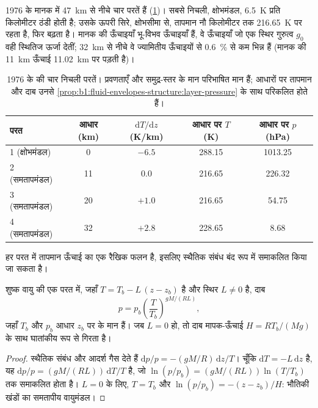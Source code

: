 1976 के मानक में \qty{47}{km} से नीचे चार परतें हैं (\cref{tab:b1:fluid-envelopes-structure:layers})। सबसे निचली, क्षोभमंडल, \qty{6.5}{K} प्रति किलोमीटर ठंडी होती है; उसके ऊपरी सिरे, क्षोभसीमा से, तापमान नौ किलोमीटर तक \qty{216.65}{K} पर रहता है, फिर बढ़ता है। मानक की ऊँचाइयाँ भू-विभव ऊँचाइयाँ हैं, वे ऊँचाइयाँ जो एक स्थिर गुरुत्व $g_0$ वही स्थितिज ऊर्जा देतीं; \qty{32}{km} से नीचे वे ज्यामितीय ऊँचाइयों से \qty{0.6}{\percent} से कम भिन्न हैं (मानक की \qty{11}{km} ऊँचाई \qty{11.02}{km} पर पड़ती है)।

\begin{table}[ht]
\centering
\small
\renewcommand{\arraystretch}{1.2}
\begin{tabular}{|l|c|c|c|c|}
\hline
परत & आधार (km) & $\mathrm dT/\mathrm dz$ (K/km) & आधार पर $T$ (K) & आधार पर $p$ (hPa) \\
\hline
1 (क्षोभमंडल) & 0 & $-6.5$ & 288.15 & 1013.25 \\
2 (समतापमंडल) & 11 & 0.0 & 216.65 & 226.32 \\
3 (समतापमंडल) & 20 & $+1.0$ & 216.65 & 54.75 \\
4 (समतापमंडल) & 32 & $+2.8$ & 228.65 & 8.68 \\
\hline
\end{tabular}
\caption{1976 के  की चार निचली परतें। प्रवणताएँ और समुद्र-स्तर के मान परिभाषित मान हैं; आधारों पर तापमान और दाब उनसे \cref{prop:b1:fluid-envelopes-structure:layer-pressure} के साथ परिकलित होते हैं।}
\label{tab:b1:fluid-envelopes-structure:layers}
\end{table}

हर परत में तापमान ऊँचाई का एक रैखिक फलन है, इसलिए स्थैतिक संबंध बंद रूप में समाकलित किया जा सकता है।

\begin{proposition}\label{prop:b1:fluid-envelopes-structure:layer-pressure}
शुष्क वायु की एक परत में, जहाँ $T = T_b - L\,(z - z_b)$ है और स्थिर $L \neq 0$ है, दाब
\[
  p = p_b \left(\frac{T}{T_b}\right)^{gM/(RL)},
\]
जहाँ $T_b$ और $p_b$ आधार $z_b$ पर के मान हैं। जब $L = 0$ हो, तो दाब मापक-ऊँचाई $H = RT_b/(Mg)$ के साथ घातांकीय रूप से गिरता है।
\end{proposition}

\begin{proof}
स्थैतिक संबंध और आदर्श गैस देते हैं $\mathrm dp/p = -(gM/R)\,\mathrm
dz/T$। चूँकि $\mathrm dT = -L\,\mathrm dz$ है, यह $\mathrm dp/p =
(gM/(RL))\,\mathrm dT/T$ है, जो $\ln(p/p_b) = (gM/(RL))
\ln(T/T_b)$ तक समाकलित होता है। $L = 0$ के लिए, $T = T_b$ और $\ln(p/p_b) = -(z - z_b)/H$: भौतिकी खंडों का समतापीय वायुमंडल।
\end{proof}

